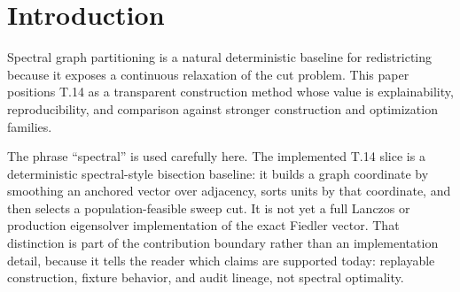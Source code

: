\section{Introduction}

Spectral graph partitioning is a natural deterministic baseline for
redistricting because it exposes a continuous relaxation of the cut problem.
This paper positions T.14 as a transparent construction method whose value is
explainability, reproducibility, and comparison against stronger construction
and optimization families.

The phrase ``spectral'' is used carefully here. The implemented T.14 slice is a
deterministic spectral-style bisection baseline: it builds a graph coordinate
by smoothing an anchored vector over adjacency, sorts units by that coordinate,
and then selects a population-feasible sweep cut. It is not yet a full Lanczos
or production eigensolver implementation of the exact Fiedler vector. That
distinction is part of the contribution boundary rather than an implementation
detail, because it tells the reader which claims are supported today: replayable
construction, fixture behavior, and audit lineage, not spectral optimality.
